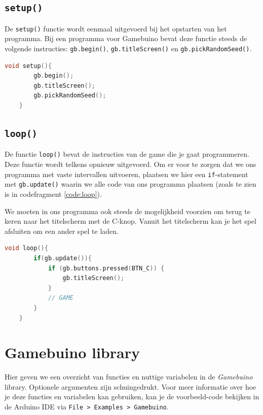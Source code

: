 \documentclass[a4paper,titlepage,12pt]{article}
\begin{document}
	
	\subsection{\texttt{setup()}}
	De \texttt{setup()} functie wordt eenmaal uitgevoerd bij het opstarten van het programma. Bij een programma voor Gamebuino bevat deze functie steeds de volgende instructies: \texttt{gb.begin()}, \texttt{gb.titleScreen()} en \texttt{gb.pickRandomSeed()}.
	\begin{lstlisting}[language=C++, caption={\texttt{setup()}}]
	void setup(){
		gb.begin();
		gb.titleScreen();
		gb.pickRandomSeed();
	}
	\end{lstlisting}
	
	
	\subsection{\texttt{loop()}}
	De functie \texttt{loop()} bevat de instructies van de game die je gaat programmeren. Deze functie wordt telkens opnieuw uitgevoerd. Om er voor te zorgen dat we ons programma met vaste intervallen uitvoeren, plaatsen we hier een \texttt{if}-statement met \texttt{gb.update()} waarin we alle code van ons programma plaatsen (zoals te zien is in codefragment \ref{code:loop}).
	
	We moeten in ons programma ook steeds de mogelijkheid voorzien om terug te keren naar het titelscherm met de C-knop. Vanuit het titelscherm kan je het spel afsluiten om een ander spel te laden.
	
	\begin{lstlisting}[float=!ht, language=C++, caption={\texttt{loop()}}, label={code:loop}]
	void loop(){
		if(gb.update()){
			if (gb.buttons.pressed(BTN_C)) {
				gb.titleScreen();
			}
			// GAME
		}
	}
	\end{lstlisting}
	
	
	\newpage
	\section{Gamebuino library}
	Hier geven we een overzicht van functies en nuttige variabelen in de \emph{Gamebuino} library\cite{Gamebuino:Wiki:Reference}.
	Optionele argumenten zijn schuingedrukt.
	Voor meer informatie over hoe je deze functies en variabelen kan gebruiken, kan je de voorbeeld-code bekijken in de Arduino IDE via \texttt{File > Examples > Gamebuino}.
	
\end{document}
